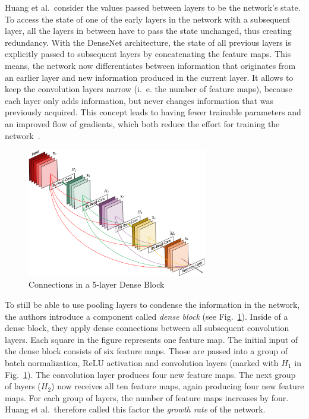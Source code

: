 Huang et al.\ consider the values passed between layers to be the network's state. To access the state of one of the early layers in the network with a subsequent layer, all the layers in between have to pass the state unchanged, thus creating redundancy. With the DenseNet architecture, the state of all previous layers is explicitly passed to subsequent layers by concatenating the feature maps. This means, the network now differentiates between information that originates from an earlier layer and new information produced in the current layer. It allows to keep the convolution layers narrow (i.~e. the number of feature maps), because each layer only adds information, but never changes information that was previously acquired. This concept leads to having fewer trainable parameters and an improved flow of gradients, which both reduce the effort for training the network~\cite{densenet17}.

\begin{figure}[h]
    \centering
    \includegraphics[width=0.7\textwidth]{images/dense-net-architecture}
    \caption[Connections in a 5-layer Dense Block]{Connections in a 5-layer Dense Block~\cite{densenet17}}
    \label{fig:dense_block}
\end{figure}

To still be able to use pooling layers to condense the information in the network, the authors introduce a component called \emph{dense block} (see Fig.~\ref{fig:dense_block}). Inside of a dense block, they apply dense connections between all subsequent convolution layers. Each square in the figure represents one feature map. The initial input of the dense block consists of six feature maps. Those are passed into a group of batch normalization, ReLU activation and convolution layers (marked with $H_1$ in Fig.~\ref{fig:dense_block}). The convolution layer produces four new feature maps. The next group of layers ($H_2$) now receives all ten feature maps, again producing four new feature maps. For each group of layers, the number of feature maps increases by four. Huang et al.\ therefore called this factor the \emph{growth rate} of the network.

